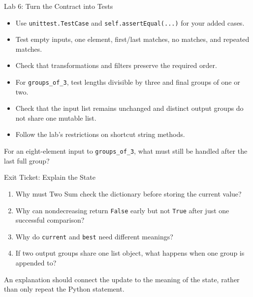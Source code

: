 \documentclass[aspectratio=169,10pt]{beamer}
\begin{document}
\begin{frame}{Lab 6: Turn the Contract into Tests}
\small
\begin{itemize}
 \item Use \texttt{unittest.TestCase} and \texttt{self.assertEqual(...)} for your added cases.
 \item Test empty inputs, one element, first/last matches, no matches, and repeated matches.
 \item Check that transformations and filters preserve the required order.
 \item For \texttt{groups\_of\_3}, test lengths divisible by three and final groups of one or two.
 \item Check that the input list remains unchanged and distinct output groups do not share one mutable list.
 \item Follow the lab's restrictions on shortcut string methods.
\end{itemize}
\begin{activity}For an eight-element input to \texttt{groups\_of\_3}, what must still be handled after the last full group?\end{activity}
\end{frame}

\begin{frame}{Exit Ticket: Explain the State}
\small
\begin{enumerate}
 \item Why must Two Sum check the dictionary before storing the current value?
 \item Why can nondecreasing return \texttt{False} early but not \texttt{True} after just one successful comparison?
 \item Why do \texttt{current} and \texttt{best} need different meanings?
 \item If two output groups share one list object, what happens when one group is appended to?
\end{enumerate}
\begin{keyidea}An explanation should connect the update to the meaning of the state, rather than only repeat the Python statement.\end{keyidea}
\end{frame}
\end{document}
